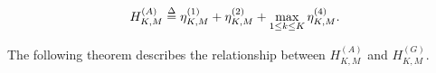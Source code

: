 \documentclass[11pt, draftclsnofoot, onecolumn]{IEEEtran}
\begin{document}
\begin{equation} \label{H_A_Define}
H_{K,M}^{\left( A \right)} \buildrel \Delta \over =  \eta _{K,M}^{(1)} + \eta _{K,M}^{(2)} + \mathop {\max }\limits_{1 \le k \le K}  \eta _{K,M}^{(4)}.
\end{equation}


The following theorem describes the relationship between $H_{K,M}^{\left( A \right)}$ and $H_{K,M}^{\left( G \right)}$.
\end{document}
